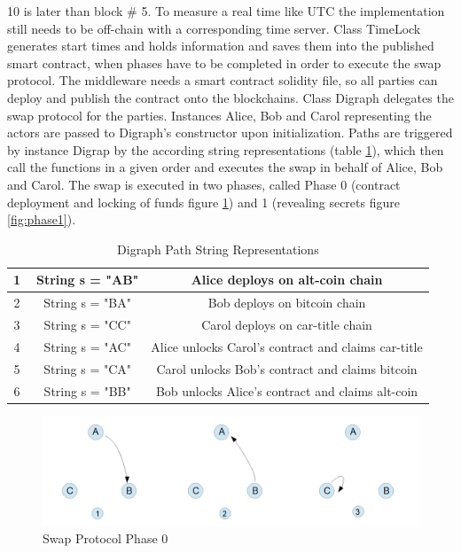 10 is later than block \# 5. To measure a real time like \ac{UTC} the implementation still needs to be off-chain with a corresponding time server. Class TimeLock generates start times and holds information and saves them into the published smart contract, when phases have to be completed in order to execute the swap protocol. The middleware needs a smart contract solidity file, so all parties can deploy and publish the contract onto the blockchains. Class Digraph delegates the swap protocol for the parties. Instances Alice, Bob and Carol representing the actors are passed to Digraph's constructor upon initialization. Paths are triggered by instance Digrap by the according string representations (table \ref{table:2}), which then call the functions in a given order and executes the swap in behalf of Alice, Bob and Carol. The swap is executed in two phases, called Phase 0 (contract deployment and locking of funds figure \ref{fig:phase0}) and 1 (revealing secrets figure \ref{fig:phase1}). \newline

\begin{table}[h!]
	\centering
	\begin{tabular}{|c | c | c |} 
		\hline 
		\textcircled{1} & String s = "AB" & Alice deploys on alt-coin chain\\ [0.5ex] 
		\hline
		\textcircled{2} & String s = "BA" & Bob deploys on bitcoin chain\\ 
		\hline
		\textcircled{3} & String s = "CC" & Carol deploys on car-title chain \\
		\hline
		\textcircled{4} & String s = "AC" & Alice unlocks Carol's contract and claims car-title \\ [1ex] 
		\hline
		\textcircled{5} & String s = "CA" & Carol unlocks Bob's contract and claims bitcoin \\ [1ex] 
		\hline
		\textcircled{6} & String s = "BB" & Bob unlocks Alice's contract and claims alt-coin \\ [1ex] 
		\hline
	\end{tabular}
	\caption{Digraph Path String Representations}
	\label{table:2}
\end{table}

\begin{figure}[h]
	\includegraphics[width=0.7\paperwidth]{phase0}	
	\caption{Swap Protocol Phase 0}
	\label{fig:phase0}
\end{figure}

